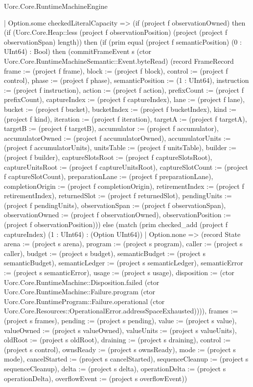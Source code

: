 \begin{lexlean}{Uorc.Core.RuntimeMachineEngine}
\begin{semanticmodule}
{      | Option.some checkedLiteralCapacity => (if (project f observationOwned) then (if (Uorc.Core.Heap::less (project f observationPosition) (project (project f observationSpan) length)) then (if (prim equal (project f semanticPosition) (0 : UInt64) : Bool) then (commitFrameEvent s (ctor Uorc.Core.RuntimeMachineSemantic::Event.byteRead) (record FrameRecord {frame := (project f frame), block := (project f block), control := (project f control), phase := (project f phase), semanticPosition := (1 : UInt64), instruction := (project f instruction), action := (project f action), prefixCount := (project f prefixCount), captureIndex := (project f captureIndex), lane := (project f lane), bucket := (project f bucket), bucketIndex := (project f bucketIndex), kind := (project f kind), iteration := (project f iteration), targetA := (project f targetA), targetB := (project f targetB), accumulator := (project f accumulator), accumulatorOwned := (project f accumulatorOwned), accumulatorUnits := (project f accumulatorUnits), unitsTable := (project f unitsTable), builder := (project f builder), captureSlotsRoot := (project f captureSlotsRoot), captureUnitsRoot := (project f captureUnitsRoot), captureSlotCount := (project f captureSlotCount), preparationLane := (project f preparationLane), completionOrigin := (project f completionOrigin), retirementIndex := (project f retirementIndex), returnedSlot := (project f returnedSlot), pendingUnits := (project f pendingUnits), observationSpan := (project f observationSpan), observationOwned := (project f observationOwned), observationPosition := (project f observationPosition)})) else (match (prim checked_add (project f captureIndex) (1 : UInt64) : (Option UInt64))
        | Option.none => (record State {arena := (project s arena), program := (project s program), caller := (project s caller), budget := (project s budget), semanticBudget := (project s semanticBudget), semanticLedger := (project s semanticLedger), semanticError := (project s semanticError), usage := (project s usage), disposition := (ctor Uorc.Core.RuntimeMachine::Disposition.failed (ctor Uorc.Core.RuntimeMachine::Failure.program (ctor Uorc.Core.RuntimeProgram::Failure.operational (ctor Uorc.Core.Resources::OperationalError.addressSpaceExhausted)))), frames := (project s frames), pending := (project s pending), value := (project s value), valueOwned := (project s valueOwned), valueUnits := (project s valueUnits), oldRoot := (project s oldRoot), draining := (project s draining), control := (project s control), ownsReady := (project s ownsReady), mode := (project s mode), cancelStarted := (project s cancelStarted), sequenceCleanup := (project s sequenceCleanup), delta := (project s delta), operationDelta := (project s operationDelta), overflowEvent := (project s overflowEvent)})
}
\end{semanticmodule}
\end{lexlean}
